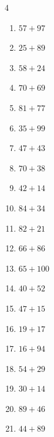\begin{multicols}{4}
\begin{enumerate}
  \item $57+97$
        \phantom{$=154$}

  \item $25+89$
        \phantom{$=114$}

  \item $58+24$
        \phantom{$=82$}

  \item $70+69$
        \phantom{$=139$}

  \item $81+77$
        \phantom{$=158$}

  \item $35+99$
        \phantom{$=134$}

  \item $47+43$
        \phantom{$=90$}

\columnbreak %

  \item $70+38$
        \phantom{$=108$}

  \item $42+14$
        \phantom{$=56$}

  \item $84+34$
        \phantom{$=118$}

  \item $82+21$
        \phantom{$=103$}

  \item $66+86$
        \phantom{$=152$}

  \item $65+100$
        \phantom{$=165$}

  \item $40+52$
        \phantom{$=92$}

  \item $47+15$
        \phantom{$=62$}

  \item $19+17$
        \phantom{$=36$}

  \item $16+94$
        \phantom{$=110$}

  \item $54+29$
        \phantom{$=83$}

  \item $30+14$
        \phantom{$=44$}

  \item $89+46$
        \phantom{$=135$}

  \item $44+89$
        \phantom{$=133$}


\end{enumerate}
\end{multicols}
